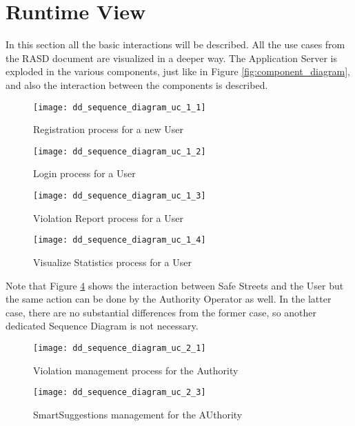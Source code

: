 \section{Runtime View}
In this section all the basic interactions will be described. All the use cases
from the RASD document are visualized in a deeper way. The Application Server is
exploded in the various components, just like in Figure
\ref{fig:component_diagram}, and also the interaction between the components is
described.

\begin{figure}[h]
    \centering
    \texttt{[image: dd\_sequence\_diagram\_uc\_1\_1]}
    \caption{Registration process for a new User}
    \label{fig:dd_sequence_diagram_uc_1_1}
\end{figure}

\begin{figure}[h]
    \centering
    \texttt{[image: dd\_sequence\_diagram\_uc\_1\_2]}
    \caption{Login process for a User}
    \label{fig:dd_sequence_diagram_uc_1_2}
\end{figure}

\begin{figure}[h]
    \centering
    \texttt{[image: dd\_sequence\_diagram\_uc\_1\_3]}
    \caption{Violation Report process for a User}
    \label{fig:dd_sequence_diagram_uc_1_3}
\end{figure}

\begin{figure}[h]
    \centering
    \texttt{[image: dd\_sequence\_diagram\_uc\_1\_4]}
    \caption{Visualize Statistics process for a User}
    \label{fig:dd_sequence_diagram_uc_1_4}
\end{figure}

Note that Figure \ref{fig:dd_sequence_diagram_uc_1_4} shows the interaction
between Safe Streets and the User but the same action can be done by the
Authority Operator as well. In the latter case, there are no substantial
differences from the former case, so another dedicated Sequence Diagram is not
necessary.

\begin{figure}[h]
    \centering
    \texttt{[image: dd\_sequence\_diagram\_uc\_2\_1]}
    \caption{Violation management process for the Authority}
    \label{fig:dd_sequence_diagram_uc_2_1}
\end{figure}

\begin{figure}[h]
    \centering
    \texttt{[image: dd\_sequence\_diagram\_uc\_2\_3]}
    \caption{SmartSuggestions management for the AUthority}
    \label{fig:dd_sequence_diagram_uc_2_3}
\end{figure}
